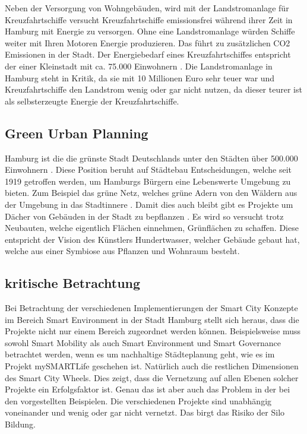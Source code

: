 Neben der Versorgung von Wohngebäuden, wird mit der Landstromanlage für Kreuzfahrtschiffe versucht Kreuzfahrtschiffe emissionsfrei während ihrer Zeit in Hamburg mit Energie zu versorgen.
Ohne eine Landstromanlage würden Schiffe weiter mit Ihren Motoren Energie produzieren.
Das führt zu zusätzlichen CO2 Emissionen in der Stadt.
Der Energiebedarf eines Kreuzfahrtschiffes entspricht der einer Kleinstadt mit ca. 75.000 Einwohnern \autocite[vgl.][]{SmartCityKompass.OD}.
Die Landstromanlage in Hamburg steht in Kritik, da sie mit 10 Millionen Euro sehr teuer war und Kreuzfahrtschiffe den Landstrom wenig oder gar nicht nutzen, da dieser teurer ist als selbsterzeugte Energie der Kreuzfahrtschiffe.

\subsection{Green Urban Planning}
Hamburg ist die die grünste Stadt Deutschlands unter den Städten über 500.000 Einwohnern \autocite[vgl.][]{BerlinerMorgenpost.2016}.
Diese Position beruht auf Städtebau Entscheidungen, welche seit 1919 getroffen werden, um Hamburgs Bürgern eine Lebenswerte Umgebung zu bieten. Zum Beispiel das grüne Netz, welches grüne Adern von den Wäldern aus der Umgebung in das Stadtinnere \autocite[vgl.][]{Hamburg.ODC}.
Damit dies auch bleibt gibt es Projekte um Dächer von Gebäuden in der Stadt zu bepflanzen \autocite[vgl.][]{Hamburg.ODD}.
Es wird so versucht trotz Neubauten, welche eigentlich Flächen einnehmen, Grünflächen zu schaffen.
Diese entspricht der Vision des Künstlers Hundertwasser, welcher Gebäude gebaut hat, welche aus einer Symbiose aus Pflanzen und Wohnraum besteht.

\subsection{kritische Betrachtung}
Bei Betrachtung der verschiedenen Implementierungen der Smart City Konzepte im Bereich Smart Environment in der Stadt Hamburg stellt sich heraus, dass die Projekte nicht nur einem Bereich zugeordnet werden können.
Beispielsweise muss sowohl Smart Mobility als auch Smart Environment und Smart Governance betrachtet werden, wenn es um nachhaltige Städteplanung geht, wie es im Projekt mySMARTLife geschehen ist.
Natürlich auch die restlichen Dimensionen des Smart City Wheels.
Dies zeigt, dass die Vernetzung auf allen Ebenen solcher Projekte ein Erfolgsfaktor ist.
Genau das ist aber auch das Problem in der bei den vorgestellten Beispielen.
Die verschiedenen Projekte sind unabhängig voneinander und wenig oder gar nicht vernetzt.
Das birgt das Risiko der Silo Bildung.
